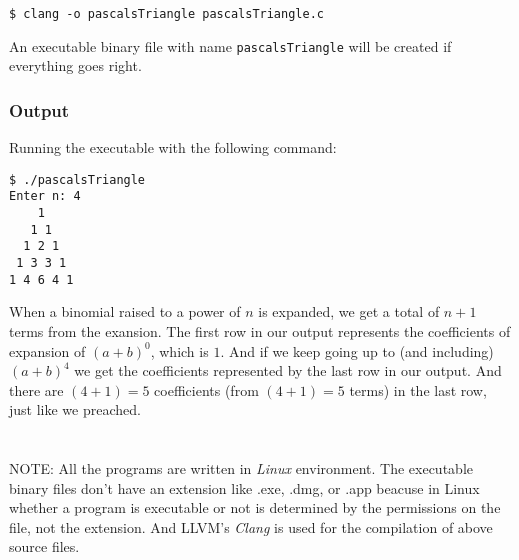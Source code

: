 \documentclass[12pt, letterpaper]{report}
\begin{document}
\begin{verbatim}
$ clang -o pascalsTriangle pascalsTriangle.c
\end{verbatim}
An executable binary file with name \texttt{pascalsTriangle} will be created if everything goes right.
\subsubsection*{Output}
Running the executable with the following command:
\begin{verbatim}
$ ./pascalsTriangle
Enter n: 4
    1 
   1 1 
  1 2 1 
 1 3 3 1 
1 4 6 4 1 
\end{verbatim}
When a binomial raised to a power of $n$ is expanded, we get a total of $n+1$ terms from the exansion. The first row in our
output represents the coefficients of expansion of $(a + b)^0$, which is $1$. And if we keep going up to (and including) $(a + b)^4$ we get the coefficients represented by the last row in our output. And there are $(4 + 1) = 5$ coefficients (from $(4 + 1) = 5$ terms) in the last row, just like we preached.
\section*{}
NOTE: All the programs are written in \emph{Linux} environment. The executable binary files don't have an extension like .exe, .dmg, or .app beacuse in Linux whether a program is executable or not is determined by the permissions on the file, not the extension. And LLVM's \emph{Clang} is used for the compilation of above source files.
\end{document}
